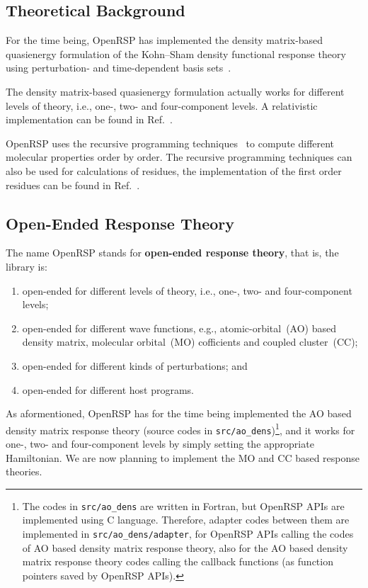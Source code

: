 \subsection{Theoretical Background}
\label{subsection-theory}

For the time being, OpenRSP has implemented the density matrix-based
quasienergy formulation of the Kohn--Sham density functional response theory
using perturbation- and time-dependent basis
sets~\cite{Thorvaldsen-JCP-129-214108,Bast-PCCP-13-2627}.

The density matrix-based quasienergy formulation actually works for different
levels of theory, i.e., one-, two- and four-component levels. A relativistic
implementation can be found in Ref.~\cite{Bast-CP-356-177}.

OpenRSP uses the recursive programming techniques~\cite{Ringholm-JCC-35-622}
to compute different molecular properties order by order. The recursive
programming techniques can also be used for calculations of residues, the
implementation of the first order residues can be found in
Ref.~\cite{Friese-JCTC-11-1129}.

\subsection{Open-Ended Response Theory}
\label{subsection-open-ended}

The name OpenRSP stands for \textbf{open-ended response theory}, that is,
the library is:
\begin{enumerate}
  \item open-ended for different levels of theory, i.e., one-, two- and
    four-component levels;
  \item open-ended for different wave functions, e.g., atomic-orbital~(AO)
    based density matrix, molecular orbital~(MO) cofficients and
    coupled cluster~(CC);
  \item open-ended for different kinds of perturbations; and
  \item open-ended for different host programs.
\end{enumerate}

As aformentioned, OpenRSP has for the time being implemented the AO based
density matrix response theory (source codes in
\texttt{src/ao\_dens})\footnote{The codes in \texttt{src/ao\_dens} are written
in Fortran, but OpenRSP APIs are implemented using C language. Therefore,
adapter codes between them are implemented in \texttt{src/ao\_dens/adapter},
for OpenRSP APIs calling the codes of AO based density matrix response theory,
also for the AO based density matrix response theory codes calling the callback
functions (as function pointers saved by OpenRSP APIs).}, and it works for
one-, two- and four-component levels by simply setting the appropriate
Hamiltonian. We are now planning to implement the MO and CC based response
theories.

